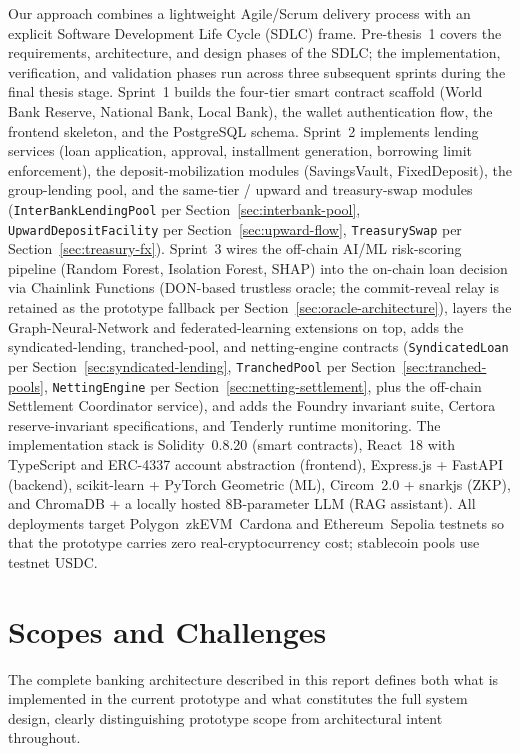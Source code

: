 \documentclass[12pt,a4paper]{report}
\begin{document}
Our approach combines a lightweight Agile/Scrum delivery process with an explicit Software Development Life Cycle (SDLC) frame. Pre-thesis~1 covers the requirements, architecture, and design phases of the SDLC; the implementation, verification, and validation phases run across three subsequent sprints during the final thesis stage. Sprint~1 builds the four-tier smart contract scaffold (World Bank Reserve, National Bank, Local Bank), the wallet authentication flow, the frontend skeleton, and the PostgreSQL schema. Sprint~2 implements lending services (loan application, approval, installment generation, borrowing limit enforcement), the deposit-mobilization modules (SavingsVault, FixedDeposit), the group-lending pool, and the same-tier / upward and treasury-swap modules (\texttt{InterBankLendingPool} per Section~\ref{sec:interbank-pool}, \texttt{UpwardDepositFacility} per Section~\ref{sec:upward-flow}, \texttt{TreasurySwap} per Section~\ref{sec:treasury-fx}). Sprint~3 wires the off-chain AI/ML risk-scoring pipeline (Random Forest, Isolation Forest, SHAP) into the on-chain loan decision via Chainlink Functions (DON-based trustless oracle; the commit-reveal relay is retained as the prototype fallback per Section~\ref{sec:oracle-architecture}), layers the Graph-Neural-Network and federated-learning extensions on top, adds the syndicated-lending, tranched-pool, and netting-engine contracts (\texttt{SyndicatedLoan} per Section~\ref{sec:syndicated-lending}, \texttt{TranchedPool} per Section~\ref{sec:tranched-pools}, \texttt{NettingEngine} per Section~\ref{sec:netting-settlement}, plus the off-chain Settlement Coordinator service), and adds the Foundry invariant suite, Certora reserve-invariant specifications, and Tenderly runtime monitoring. The implementation stack is Solidity~0.8.20 (smart contracts), React~18 with TypeScript and ERC-4337 account abstraction (frontend), Express.js + FastAPI (backend), scikit-learn + PyTorch Geometric (ML), Circom~2.0 + snarkjs (ZKP), and ChromaDB + a locally hosted 8B-parameter LLM (RAG assistant). All deployments target Polygon~zkEVM~Cardona and Ethereum~Sepolia testnets so that the prototype carries zero real-cryptocurrency cost; stablecoin pools use testnet USDC.

\section{Scopes and Challenges}

\noindent The complete banking architecture described in this report defines both what is implemented in the current prototype and what constitutes the full system design, clearly distinguishing prototype scope from architectural intent throughout.
\end{document}
